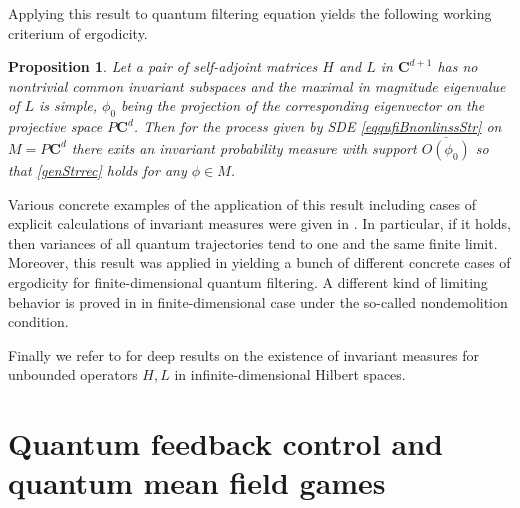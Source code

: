 \documentclass[12pt]{article}
\def\C{\mathbf{C}}
\newtheorem{prop}{Proposition}[section]
\begin{document}
Applying this result to quantum filtering equation yields the following working criterium of ergodicity.

\begin{prop}
\label{propmygenerg}
Let a pair of self-adjoint matrices $H$ and $L$ in $\C^{d+1}$ has no nontrivial common invariant subspaces
and the maximal in magnitude eigenvalue of $L$ is simple, $\phi_0$ being the projection of the corresponding
 eigenvector on the projective space $P\C^d$. Then for the process given by SDE
\eqref{eqqufiBnonlinssStr} on $M=P\C^d$ there exits an invariant probability measure
with support $\overline{O(\phi_0)}$ so that \eqref{genStrrec} holds for any $\phi\in M$.
\end{prop}

Various concrete examples of the application of this result including cases of explicit
calculations of invariant measures were given in \cite{Kol93}. In particular, if it holds,
 then variances of all quantum trajectories tend to one and the same finite limit.
Moreover, this result
was applied in \cite{BarchPag} yielding a bunch of different concrete cases of ergodicity
for finite-dimensional quantum filtering.
A different kind of limiting behavior is proved in \cite{BenPellegrini}
in finite-dimensional case under the so-called
nondemolition condition.

Finally we refer to \cite{Mora13} for deep results on the existence of invariant measures
for unbounded operators $H,L$  in infinite-dimensional Hilbert spaces.


\section{Quantum feedback control and quantum mean field games}
\label{seccont}

\end{document}
